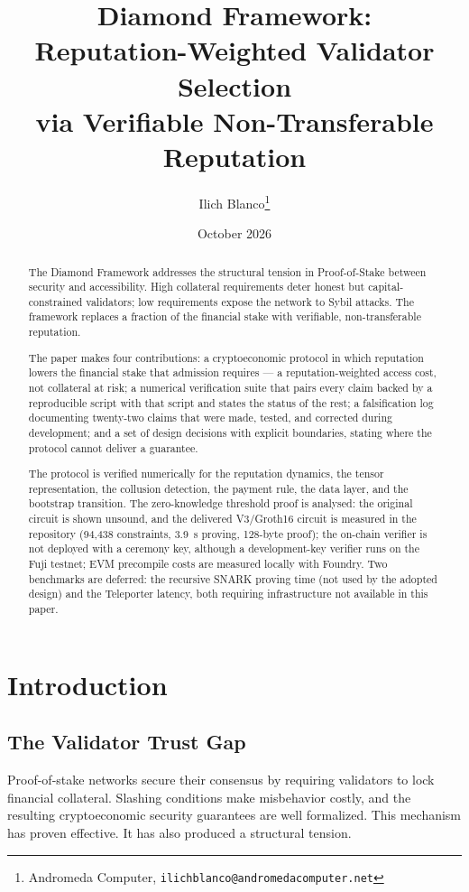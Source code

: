 \documentclass[11pt,a4paper]{article}
\title{\textbf{Diamond Framework:}\\[0.5em]Reputation-Weighted Validator Selection\\via Verifiable Non-Transferable Reputation}
\author{Ilich Blanco\thanks{Andromeda Computer, \texttt{ilichblanco@andromedacomputer.net}}}
\date{October 2026}
\numberwithin{equation}{section}
\numberwithin{table}{section}
\begin{document}
\maketitle

\begin{abstract}
The Diamond Framework addresses the structural tension in Proof-of-Stake between security and accessibility. High collateral requirements deter honest but capital-constrained validators; low requirements expose the network to Sybil attacks. The framework replaces a fraction of the financial stake with verifiable, non-transferable reputation.

The paper makes four contributions: a cryptoeconomic protocol in which reputation lowers the financial stake that admission requires --- a reputation-weighted access cost, not collateral at risk; a numerical verification suite that pairs every claim backed by a reproducible script with that script and states the status of the rest; a falsification log documenting twenty-two claims that were made, tested, and corrected during development; and a set of design decisions with explicit boundaries, stating where the protocol cannot deliver a guarantee.

The protocol is verified numerically for the reputation dynamics, the tensor representation, the collusion detection, the payment rule, the data layer, and the bootstrap transition. The zero-knowledge threshold proof is analysed: the original circuit is shown unsound, and the delivered V3/Groth16 circuit is measured in the repository (94{,}438 constraints, 3.9~s proving, 128-byte proof); the on-chain verifier is not deployed with a ceremony key, although a development-key verifier runs on the Fuji testnet; EVM precompile costs are measured locally with Foundry. Two benchmarks are deferred: the recursive SNARK proving time (not used by the adopted design) and the Teleporter latency, both requiring infrastructure not available in this paper.
\end{abstract}

\tableofcontents
\newpage

\section{Introduction}

\subsection{The Validator Trust Gap}
Proof-of-stake networks secure their consensus by requiring validators to lock financial collateral. Slashing conditions make misbehavior costly, and the resulting cryptoeconomic security guarantees are well formalized. This mechanism has proven effective. It has also produced a structural tension.
\end{document}
